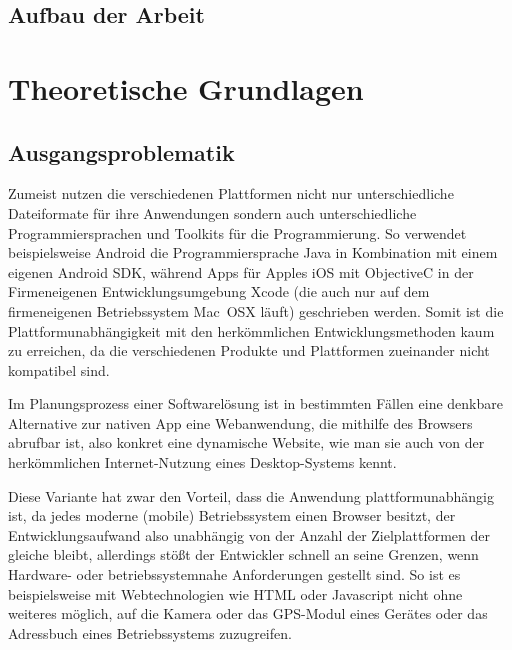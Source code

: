 \documentclass[bibtotoc]{scrreprt}
\begin{document}
\section{Aufbau der Arbeit} %


\chapter{Theoretische Grundlagen}

\section{Ausgangsproblematik}
Zumeist nutzen die verschiedenen Plattformen nicht nur unterschiedliche Dateiformate für ihre Anwendungen sondern auch unterschiedliche Programmiersprachen und Toolkits für die Programmierung. So verwendet beispielsweise Android die Programmiersprache Java in Kombination mit einem eigenen Android SDK, während Apps für Apples iOS mit ObjectiveC in der Firmeneigenen Entwicklungsumgebung Xcode (die auch nur auf dem firmeneigenen Betriebssystem Mac~OSX läuft) geschrieben werden. Somit ist die Plattformunabhängigkeit mit den herkömmlichen Entwicklungsmethoden kaum zu erreichen, da die verschiedenen Produkte und Plattformen zueinander nicht kompatibel sind.

Im Planungsprozess einer Softwarelösung ist in bestimmten Fällen eine denkbare Alternative zur nativen App eine Webanwendung, die mithilfe des Browsers abrufbar ist, also konkret eine dynamische Website, wie man sie auch von der herkömmlichen Internet-Nutzung eines Desktop-Systems kennt. 

Diese Variante hat zwar den Vorteil, dass die Anwendung plattformunabhängig ist, da jedes moderne (mobile) Betriebssystem einen Browser besitzt, der Entwicklungsaufwand also unabhängig von der Anzahl der Zielplattformen der gleiche bleibt, allerdings stößt der Entwickler schnell an seine Grenzen, wenn Hardware- oder betriebssystemnahe Anforderungen gestellt sind. So ist es beispielsweise mit Webtechnologien wie HTML oder Javascript nicht ohne weiteres möglich, auf die Kamera oder das GPS-Modul eines Gerätes oder das Adressbuch eines Betriebssystems zuzugreifen.
\end{document}
